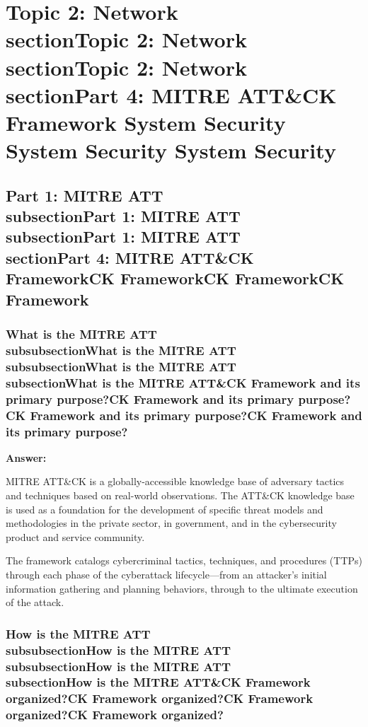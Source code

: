 \documentclass[12pt,a4paper]{article}
\begin{document}
\section{Topic 2: Network \\section{Topic 2: Network \\section{Topic 2: Network \\section{Part 4: MITRE ATT\&CK Framework} System Security} System Security} System Security}

\subsection{Part 1: MITRE ATT\\subsection{Part 1: MITRE ATT\\subsection{Part 1: MITRE ATT\\section{Part 4: MITRE ATT\&CK Framework}CK Framework}CK Framework}CK Framework}

\subsubsection{What is the MITRE ATT\\subsubsection{What is the MITRE ATT\\subsubsection{What is the MITRE ATT\\subsection{What is the MITRE ATT\&CK Framework and its primary purpose?}CK Framework and its primary purpose?}CK Framework and its primary purpose?}CK Framework and its primary purpose?}

\textbf{Answer:}

MITRE ATT\&CK is a globally-accessible knowledge base of adversary tactics and techniques based on real-world observations.  The ATT\&CK knowledge base is used as a foundation for the development of specific threat models and methodologies in the private sector, in government, and in the cybersecurity product and service community. 

The framework catalogs cybercriminal tactics, techniques, and procedures (TTPs) through each phase of the cyberattack lifecycle—from an attacker's initial information gathering and planning behaviors, through to the ultimate execution of the attack. 

\subsubsection{How is the MITRE ATT\\subsubsection{How is the MITRE ATT\\subsubsection{How is the MITRE ATT\\subsection{How is the MITRE ATT\&CK Framework organized?}CK Framework organized?}CK Framework organized?}CK Framework organized?}
\end{document}
